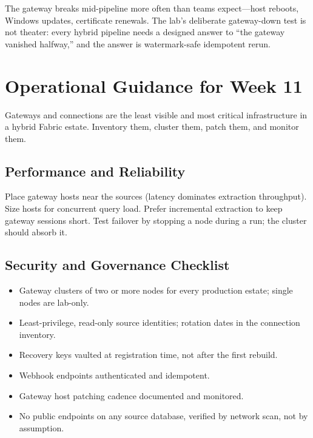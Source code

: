 \begin{pitfall}
The gateway breaks mid-pipeline more often than teams expect---host reboots, Windows updates, certificate renewals. The lab's deliberate gateway-down test is not theater: every hybrid pipeline needs a designed answer to ``the gateway vanished halfway,'' and the answer is watermark-safe idempotent rerun.
\end{pitfall}

\section{Operational Guidance for Week 11}
Gateways and connections are the least visible and most critical infrastructure in a hybrid Fabric estate. Inventory them, cluster them, patch them, and monitor them.

\subsection{Performance and Reliability}
Place gateway hosts near the sources (latency dominates extraction throughput). Size hosts for concurrent query load. Prefer incremental extraction to keep gateway sessions short. Test failover by stopping a node during a run; the cluster should absorb it.

\subsection{Security and Governance Checklist}
\begin{itemize}
    \item Gateway clusters of two or more nodes for every production estate; single nodes are lab-only.
    \item Least-privilege, read-only source identities; rotation dates in the connection inventory.
    \item Recovery keys vaulted at registration time, not after the first rebuild.
    \item Webhook endpoints authenticated and idempotent.
    \item Gateway host patching cadence documented and monitored.
    \item No public endpoints on any source database, verified by network scan, not by assumption.
\end{itemize}


